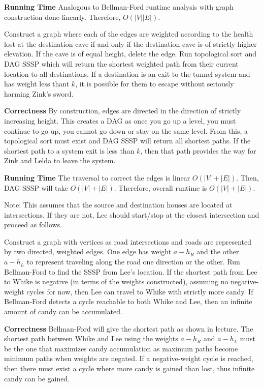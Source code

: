 \documentclass[12pt,twoside]{article}
\begin{document}
\begin{problems}
{\bf Running Time} Analogous to Bellman-Ford runtime analysis with graph
construction done linearly. Therefore, $O(|V||E|)$.

\newpage

 Construct a graph where each of the edges are
weighted according to the health lost at the destination cave if and only if
the destination cave is of strictly higher elevation. If the cave is of equal
height, delete the edge. Run topological sort and DAG SSSP which will return
the shortest weighted path from their current location to all destinations.
If a destination is an exit to the tunnel system and has weight less thant
$k$, it is possible for them to escape without seriously harming Zink's
sword.

{\bf Correctness} By construction, edges are directed in the direction of
strictly increasing height. This creates a DAG as once you go up a level, you
must continue to go up, you cannot go down or stay on the same level. From
this, a topological sort must exist and DAG SSSP will return all shortest
paths. If the shortest path to a system exit is less than $k$, then that path
provides the way for Zink and Lelda to leave the system.

{\bf Running Time} The traversal to correct the edges is linear $O(|V| +
|E|)$. Then, DAG SSSP will take $O(|V| + |E|)$. Therefore, overall runtime is
$O(|V| + |E|)$.

 Note: This assumes that the source and destination
houses are located at intersections. If they are not, Lee should start/stop
at the closest intersection and proceed as follows. 

Construct a graph with vertices as road intersections and roads are
represented by two directed, weighted edges. One edge has weight $a - h_R$
and the other $a - h_L$ to represent traveling along the road one direction
or the other. Run Bellman-Ford to find the SSSP from Lee's location. If the
shortest path from Lee to Whike is negative (in terms of the weights
constructed), assuming no negative-weight cycles for now, then Lee can travel
to Whike with strictly more candy. If Bellman-Ford detects a cycle reachable
to both Whike and Lee, then an infinite amount of candy can be accumulated.

{\bf Correctness} Bellman-Ford will give the shortest path as shown in
lecture. The shortest path between Whike and Lee using the weights $a - h_R$
and $a - h_L$ must be the one that maximizes candy accumulation as maximum
paths become minimum paths when weights are negated. If a negative-weight
cycle is reached, then there must exist a cycle where more candy is gained
than lost, thus infinite candy can be gained.


\end{problems}
\end{document}
